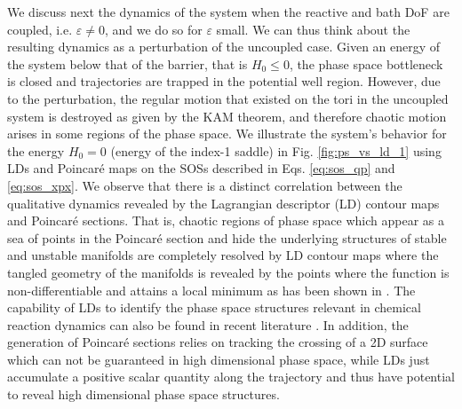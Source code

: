 \documentclass[8pt]{article}
\begin{document}
We discuss next the dynamics of the system when the reactive and bath DoF are coupled, i.e. $\varepsilon \neq 0$, and we do so for $\varepsilon$ small. We can thus think about the resulting dynamics as a perturbation of the uncoupled case. Given an energy of the system below that of the barrier, that is $H_0 \leq 0$, the phase space bottleneck is closed and trajectories are trapped in the potential well region. However, due to the perturbation, the regular motion that existed on the tori in the uncoupled system is destroyed as given by the KAM theorem, and  therefore chaotic motion arises in some regions of the phase space. We illustrate the system's behavior for the energy $H_0 = 0$ (energy of the index-1 saddle) in Fig. \ref{fig:ps_vs_ld_1} using LDs and Poincar\'e maps on the SOSs described in Eqs. \eqref{eq:sos_qp} and \eqref{eq:sos_xpx}. We observe that there is a distinct correlation between the qualitative dynamics revealed by the Lagrangian descriptor (LD) contour maps and Poincar\'e sections. That is, chaotic regions of phase space which appear as a sea of points in the Poincar\'e section and hide the underlying structures of stable and unstable manifolds are completely resolved by LD contour maps where the tangled geometry of the manifolds is revealed by the points where the function is non-differentiable and attains a local minimum as has been shown in \cite{lopesino2017,naik2019b,GG2019}. The capability of LDs to identify the phase space structures relevant in chemical reaction dynamics can also be found in recent literature \cite{craven2016deconstructing,demian2017,Naik2019a,revuelta2019unveiling}. In addition, the generation of Poincar\'e sections relies on tracking the crossing of a 2D surface which can not be guaranteed in high dimensional phase space, while LDs just accumulate a positive scalar quantity along the trajectory and thus have potential to reveal high dimensional phase space structures.
\end{document}
